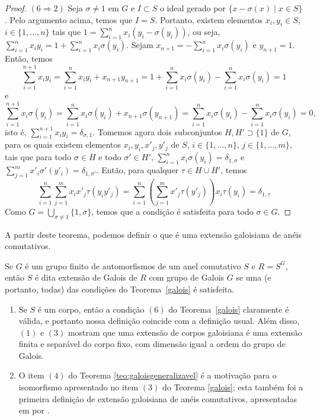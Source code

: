 \begin{teo}
\begin{proof}
$(6\Rightarrow 2)$
Seja $\sigma\neq 1$ em $G$ e $I\subset S$ o ideal gerado por $\{x-\sigma(x) \mid x \in S\}$. Pelo argumento acima, temos que $I=S$. Portanto, existem elementos $x_i, y_i \in S$, $i \in \{1,\dots, n\}$ tais que $1=\sum_{i=1}^{n}x_i(y_i-\sigma(y_i))$, ou seja,  $\sum_{i=1}^{n}x_iy_i = 1 + \sum_{i=1}^{n}x_i\sigma(y_i)$. Sejam $x_{n+1} = -\sum_{i=1}^{n}x_i\sigma(y_i)$ e $y_{n+1}=1$. Então, temos
\[\sum_{i=1}^{n+1} x_iy_i = \sum_{i=1}^{n}x_iy_i + x_{n+1}y_{n+1} = 1 + \sum_{i=1}^{n}x_i\sigma(y_i)-\sum_{i=1}^{n}x_i\sigma(y_i) = 1\]
e
\[\sum_{i=1}^{n+1}x_i\sigma(y_i) = \sum_{i=1}^{n}x_i\sigma(y_i) + x_{n+1}\sigma(y_{n+1}) = \sum_{i=1}^{n}x_i\sigma(y_i) -\sum_{i=1}^{n}x_i\sigma(y_i) = 0,\]
isto é, $\sum_{i=1}^{n+1} x_iy_i=\delta_{\sigma,1}$. Tomemos agora dois subconjuntos $H, H'\supset \{1\}$ de $G$, para os quais existem elementos $x_i,y_i,x'_j,y'_j$ de $S$, $i\in \{1,\dots, n\}$, $j\in\{1,\dots, m\}$, tais que para todo $\sigma\in H$ e todo $\sigma'\in H'$, $\sum_{i=1}^{n} x_i \sigma(y_i) = \delta_{1,\sigma}$ e $\sum_{j=1}^{m} x'_i \sigma'(y'_i) = \delta_{1,\sigma'}$. Então, para qualquer $\tau \in H \cup H'$, temos\[\sum_{i=1}^{n}\sum_{j=1}^{m} x_ix'_j \tau(y_iy'_j) = \sum_{i=1}^{n}\left(\sum_{j=1}^{m} x'_j \tau(y'_j)\right)x_i\tau(y_i) =\delta_{1,\tau}\]
Como $G= \bigcup_{\sigma \neq 1}\{1,\sigma\}$, temos que a condição é satisfeita para todo $\sigma \in G$.
\end{proof}
\end{teo}



A partir deste teorema, podemos definir o que é uma extensão galoisiana de anéis comutativos.

\begin{defn}
Se $G$ é um grupo finito de automorfismos de um anel comutativo $S$ e $R=S^G$, então $S$ é dita extensão de Galois de $R$ com grupo de Galois $G$ se uma (e portanto, todas) das condições do Teorema~\ref{galois} é satisfeita.
\end{defn}


\begin{remark}
\begin{enumerate}
    \item Se $S$ é um corpo, então a condição $(6)$ do Teorema~\ref{galois} claramente é válida, e portanto nossa definição coincide com a definição usual. Além disso, $(1)$ e $(3)$ mostram que uma extensão de corpos galoisiana é uma extensão finita e separável do corpo fixo, com dimensão igual a ordem do grupo de Galois.
    \item O item $(4)$ do Teorema \ref{teo:galoisgeneralizavel} é a motivação para o isomorfismo apresentado no item $(3)$ do Teorema \ref{galois}; esta também foi a primeira definição de extensão galoisiana de anéis comutativos, apresentadas em \cite{brauer} por \citeauthor{brauer}.
\end{enumerate}
\end{remark}

